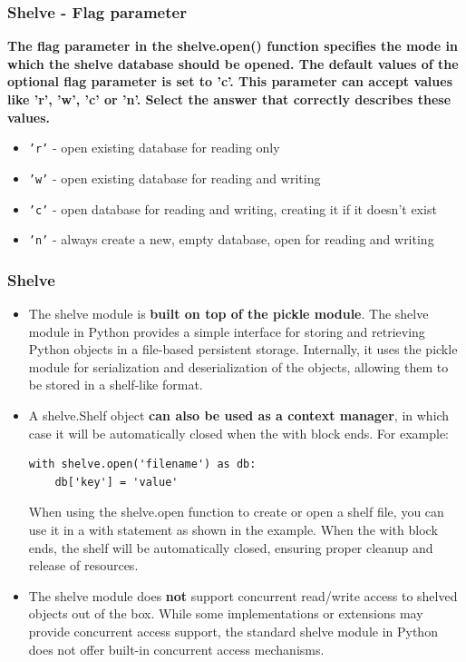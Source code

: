 \subsubsection{Shelve - Flag parameter}
\textbf{The flag parameter in the shelve.open() function specifies the mode in which the shelve database should be opened. The default values of the optional flag parameter is set to 'c'. This parameter can accept values like 'r', 'w', 'c' or 'n'. Select the answer that correctly describes these values.}
\begin{itemize}
    \item \texttt{'r'} - open existing database for reading only
    \item \texttt{'w'} - open existing database for reading and writing
    \item \texttt{'c'} - open database for reading and writing, creating it if it doesn’t exist
    \item \texttt{'n'} - always create a new, empty database, open for reading and writing
\end{itemize}

\newpage
\subsubsection{Shelve}
\begin{itemize}
\item The shelve module is \textbf{built on top of the pickle module}. The shelve module in Python provides a simple interface for storing and retrieving Python objects in a file-based persistent storage. Internally, it uses the pickle module for serialization and deserialization of the objects, allowing them to be stored in a shelf-like format.

\item A shelve.Shelf object \textbf{can also be used as a context manager}, in which case it will be automatically closed when the with block ends. For example:

\begin{codebox}
\begin{verbatim}
with shelve.open('filename') as db:
    db['key'] = 'value'
\end{verbatim}
\end{codebox}

When using the shelve.open function to create or open a shelf file, you can use it in a with statement as shown in the example. When the with block ends, the shelf will be automatically closed, ensuring proper cleanup and release of resources.

\item The shelve module does \textbf{not} support concurrent read/write access to shelved objects out of the box. While some implementations or extensions may provide concurrent access support, the standard shelve module in Python does not offer built-in concurrent access mechanisms.
\end{itemize}


